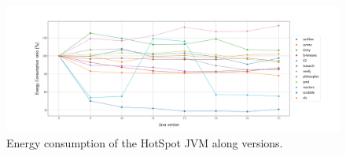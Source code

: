 \begin{figure}%
    \centering
    \includegraphics[width=\linewidth]{imgs/lineplothotspot_chetemi8_baseon8}
    \caption{Energy consumption of the HotSpot JVM along versions.}
    \label{fig:hotspot8}
\end{figure}



